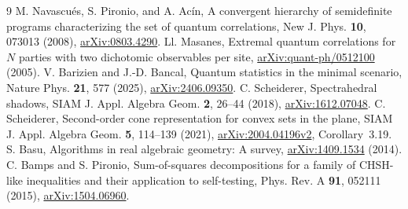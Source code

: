 \begin{thebibliography}{9}
 M. Navascu\'es, S. Pironio, and A. Ac\'in,
A convergent hierarchy of semidefinite programs characterizing the set of quantum correlations,
New J. Phys. \textbf{10}, 073013 (2008),
\href{https://arxiv.org/abs/0803.4290}{arXiv:0803.4290}.
 Ll. Masanes,
Extremal quantum correlations for $N$ parties with two dichotomic observables per site,
\href{https://arxiv.org/abs/quant-ph/0512100}{arXiv:quant-ph/0512100} (2005).
 V. Barizien and J.-D. Bancal,
Quantum statistics in the minimal scenario,
Nature Phys. \textbf{21}, 577 (2025),
\href{https://arxiv.org/abs/2406.09350}{arXiv:2406.09350}.
 C. Scheiderer,
Spectrahedral shadows,
SIAM J. Appl. Algebra Geom. \textbf{2}, 26--44 (2018),
\href{https://arxiv.org/abs/1612.07048}{arXiv:1612.07048}.
 C. Scheiderer,
Second-order cone representation for convex sets in the plane,
SIAM J. Appl. Algebra Geom. \textbf{5}, 114--139 (2021),
\href{https://arxiv.org/abs/2004.04196v2}{arXiv:2004.04196v2}, Corollary~3.19.
 S. Basu,
Algorithms in real algebraic geometry: A survey,
\href{https://arxiv.org/abs/1409.1534}{arXiv:1409.1534} (2014).
 C. Bamps and S. Pironio,
Sum-of-squares decompositions for a family of CHSH-like inequalities and their application to self-testing,
Phys. Rev. A \textbf{91}, 052111 (2015),
\href{https://arxiv.org/abs/1504.06960}{arXiv:1504.06960}.
\end{thebibliography}
